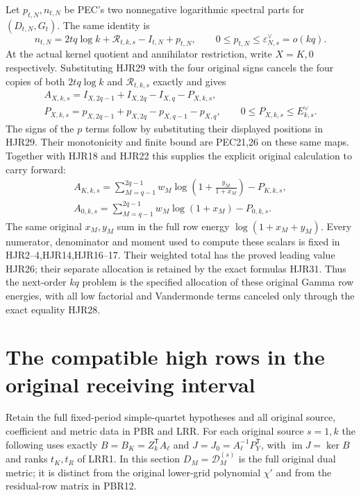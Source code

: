 \documentclass[11pt,a4paper]{article}
\begin{document}
Let $p_{t,N},n_{t,N}$ be PEC's two nonnegative logarithmic
spectral parts for $(D_{t,N},G_t)$. The same identity is
\[
 n_{t,N}
   =2tq\log k+\mathscr R_{t,k,s}-I_{t,N}+p_{t,N},
 \qquad 0\le p_{t,N}\le\varepsilon_{N,s}^{\vee}=o(kq).
 \tag{HJR29}
\]
At the actual kernel quotient and annihilator restriction,
write $X=K,0$ respectively. Substituting HJR29 with the
four original signs cancels the four copies of both
$2tq\log k$ and $\mathscr R_{t,k,s}$ exactly and gives
\[
 \begin{gathered}
 A_{X,k,s}
       =I_{X,2q-1}+I_{X,2q}-I_{X,q}-P_{X,k,s},\\
 P_{X,k,s}=p_{X,2q-1}+p_{X,2q}-p_{X,q-1}-p_{X,q},\qquad
 0\le P_{X,k,s}\le E_{k,s}^{\vee}.
 \end{gathered}\tag{HJR30}
\]
The signs of the $p$ terms follow by substituting their
displayed positions in HJR29. Their monotonicity and
finite bound are PEC21,26 on these same maps.
Together with HJR18 and HJR22 this supplies the explicit
original calculation to carry forward:
\[
 \begin{gathered}
 A_{K,k,s}
   =\sum_{M=q-1}^{2q-1}w_M
          \log\left(1+\frac{y_M}{1+x_M}\right)-P_{K,k,s},\\
 A_{0,k,s}
   =\sum_{M=q-1}^{2q-1}w_M\log(1+x_M)-P_{0,k,s}.
 \end{gathered}\tag{HJR31}
\]
The same original $x_M,y_M$ sum in the full row energy
$\log(1+x_M+y_M)$. Every numerator, denominator and
moment used to compute these scalars is fixed in
HJR2--4,HJR14,HJR16--17. Their weighted total has the
proved leading value HJR26; their separate allocation is
retained by the exact formulas HJR31.
Thus the next-order $kq$ problem is the specified allocation
of these original Gamma row energies, with all low
factorial and Vandermonde terms canceled only through
the exact equality HJR28.


\clearpage
\section{The compatible high rows in the original receiving interval}
\label{sec:HCR}

Retain the full fixed-period simple-quartet hypotheses and all
original source, coefficient and metric data in PBR and LRR.
For each original source $s=1,k$ the following uses exactly
$B=B_K=Z_k^{\mathsf T}A_\ell$ and
$J=J_0=A_\ell^{-1}P_Y^{\mathsf T}$, with
$\operatorname{im}J=\ker B$ and ranks $t_K,t_R$ of LRR1.
In this section $D_M=\mathcal D_M^{(s)}$ is the full original
dual metric; it is distinct from the original lower-grid polynomial
$\chi'$ and from the residual-row matrix in PBR12.
\end{document}
